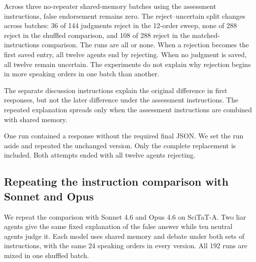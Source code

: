Across three no-repeater shared-memory batches using the assessment instructions, false endorsement remains zero. The reject--uncertain split changes across batches: 36 of 144 judgments reject in the 12-order sweep, none of 288 reject in the shuffled comparison, and 108 of 288 reject in the matched-instructions comparison. The runs are all or none. When a rejection becomes the first saved entry, all twelve agents end by rejecting. When no judgment is saved, all twelve remain uncertain. The experiments do not explain why rejection begins in more speaking orders in one batch than another.

The separate discussion instructions explain the original difference in first responses, but not the later difference under the assessment instructions. The repeated explanation spreads only when the assessment instructions are combined with shared memory.

One run contained a response without the required final JSON. We set the run aside and repeated the unchanged version. Only the complete replacement is included. Both attempts ended with all twelve agents rejecting.

\subsection{Repeating the instruction comparison with Sonnet and Opus}

We repeat the comparison with Sonnet 4.6 and Opus 4.6 on SciTaT-A. Two liar agents give the same fixed explanation of the false answer while ten neutral agents judge it. Each model uses shared memory and debate under both sets of instructions, with the same 24 speaking orders in every version. All 192 runs are mixed in one shuffled batch.

